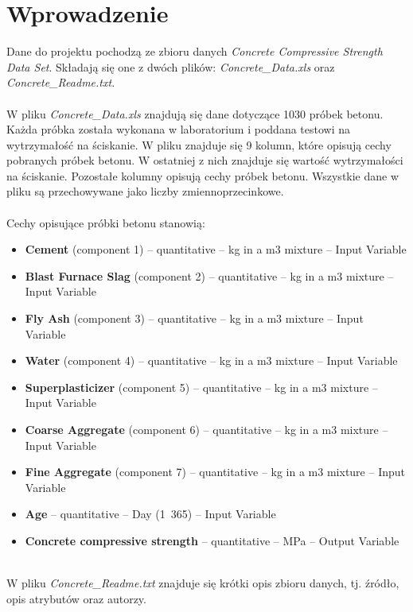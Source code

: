 \documentclass[11pt, a4paper, notitlepage]{report}
\begin{document}
\chapter{Wprowadzenie}
Dane do projektu pochodzą ze zbioru danych \textit{Concrete Compressive Strength Data Set}. Składają się one z dwóch plików: \textit{Concrete\_Data.xls} oraz \textit{Concrete\_Readme.txt}.
\\ \\
W pliku \textit{Concrete\_Data.xls} znajdują się dane dotyczące 1030 próbek betonu. Każda próbka została wykonana w laboratorium i poddana testowi na wytrzymałość na ściskanie. W pliku znajduje się 9 kolumn, które opisują cechy pobranych próbek betonu. W ostatniej z nich znajduje się wartość wytrzymałości na ściskanie. Pozostałe kolumny opisują cechy próbek betonu. Wszystkie dane w pliku są przechowywane jako liczby zmiennoprzecinkowe.
\\ \\
Cechy opisujące próbki betonu stanowią:
\begin{itemize}
	\item \textbf{Cement} (component 1) -- quantitative -- kg in a m3 mixture -- Input Variable
	\item \textbf{Blast Furnace Slag} (component 2) -- quantitative -- kg in a m3 mixture -- Input Variable
	\item \textbf{Fly Ash} (component 3) -- quantitative -- kg in a m3 mixture -- Input Variable
	\item \textbf{Water} (component 4) -- quantitative -- kg in a m3 mixture -- Input Variable
	\item \textbf{Superplasticizer} (component 5) -- quantitative -- kg in a m3 mixture -- Input Variable
	\item \textbf{Coarse Aggregate} (component 6) -- quantitative -- kg in a m3 mixture -- Input Variable
	\item \textbf{Fine Aggregate} (component 7) -- quantitative -- kg in a m3 mixture -- Input Variable
	\item \textbf{Age} -- quantitative -- Day (1~365) -- Input Variable
	\item \textbf{Concrete compressive strength} -- quantitative -- MPa -- Output Variable
\end{itemize}
\\
W pliku \textit{Concrete\_Readme.txt} znajduje się krótki opis zbioru danych, tj. źródło, opis atrybutów oraz autorzy.
\end{document}
